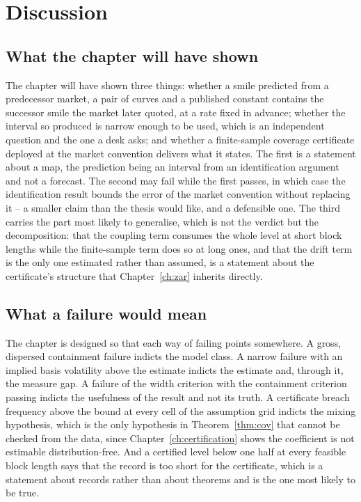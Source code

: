 \documentclass[../../../main.tex]{subfiles}
\begin{document}
\section{Discussion}\label{sec:usd-discussion}

\subsection{What the chapter will have shown}

The chapter will have shown three things: whether a smile predicted from a predecessor market, a pair of curves and a published constant contains the successor smile the market later quoted, at a rate fixed in advance; whether the interval so produced is narrow enough to be used, which is an independent question and the one a desk asks; and whether a finite-sample coverage certificate deployed at the market convention delivers what it states. The first is a statement about a map, the prediction being an interval from an identification argument and not a forecast. The second may fail while the first passes, in which case the identification result bounds the error of the market convention without replacing it -- a smaller claim than the thesis would like, and a defensible one. The third carries the part most likely to generalise, which is not the verdict but the decomposition: that the coupling term consumes the whole level at short block lengths while the finite-sample term does so at long ones, and that the drift term is the only one estimated rather than assumed, is a statement about the certificate's structure that Chapter~\ref{ch:zar} inherits directly.

\subsection{What a failure would mean}

The chapter is designed so that each way of failing points somewhere. A gross, dispersed containment failure indicts the model class. A narrow failure with an implied basis volatility above the estimate indicts the estimate and, through it, the measure gap. A failure of the width criterion with the containment criterion passing indicts the usefulness of the result and not its truth. A certificate breach frequency above the bound at every cell of the assumption grid indicts the mixing hypothesis, which is the only hypothesis in Theorem~\ref{thm:cov} that cannot be checked from the data, since Chapter~\ref{ch:certification} shows the coefficient is not estimable distribution-free. And a certified level below one half at every feasible block length says that the record is too short for the certificate, which is a statement about records rather than about theorems and is the one most likely to be true.
\end{document}
